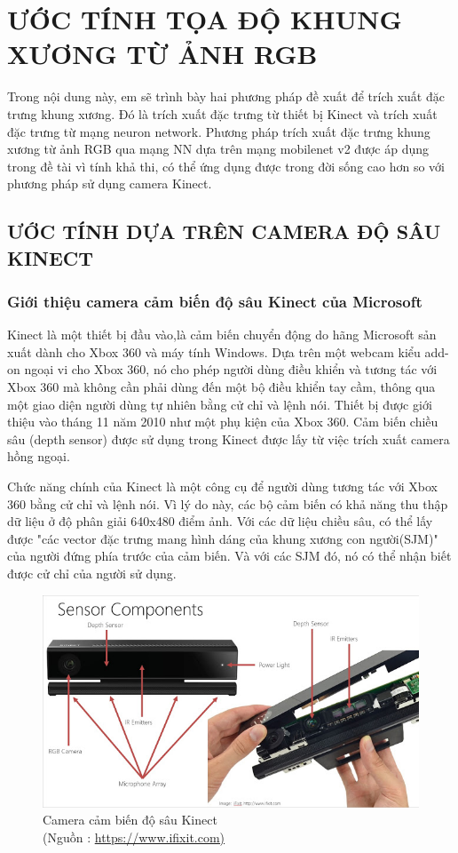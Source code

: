 \chapter{ƯỚC TÍNH TỌA ĐỘ KHUNG XƯƠNG TỪ ẢNH RGB}
\label{s:pose estimate}
Trong nội dung này, em sẽ trình bày hai phương pháp đề xuất để trích xuất đặc trưng khung xương. Đó là trích xuất đặc trưng từ thiết bị Kinect và trích xuất đặc trưng từ mạng neuron network. Phương pháp trích xuất đặc trưng khung xương từ ảnh RGB qua mạng NN dựa trên mạng mobilenet v2 được áp dụng trong đề tài vì tính khả thi, có thể ứng dụng được trong đời sống cao hơn so với phương pháp sử dụng camera Kinect.

\section{ƯỚC TÍNH DỰA TRÊN CAMERA ĐỘ SÂU KINECT}
\label{ss:kinect}
\subsection{Giới thiệu camera cảm biến độ sâu Kinect của Microsoft}
Kinect là một thiết bị đầu vào,là cảm biến chuyển động do hãng Microsoft sản xuất dành cho Xbox 360 và máy tính Windows. Dựa trên một webcam kiểu add-on ngoại vi cho Xbox 360, nó cho phép người dùng điều khiển và tương tác với Xbox 360 mà không cần phải dùng đến một bộ điều khiển tay cầm, thông qua một giao diện người dùng tự nhiên bằng cử chỉ và lệnh nói. Thiết bị được giới thiệu vào tháng 11 năm 2010 như một phụ kiện của Xbox 360. Cảm biến chiều sâu (depth sensor) được sử dụng trong Kinect được lấy từ việc trích xuất camera hồng ngoại. 

Chức năng chính của Kinect là một công cụ để người dùng tương tác với Xbox 360 bằng cử chỉ và lệnh nói. Vì lý do này, các bộ cảm biến có khả năng thu thập dữ liệu ở độ phân giải 640x480 điểm ảnh. Với các dữ liệu chiều sâu, có thể lấy được "các vector đặc trưng mang hình dáng của khung xương con người(SJM)" của người đứng phía trước của cảm biến. Và với các SJM đó, nó có thể nhận biết được cử chỉ của người sử dụng.


\begin{figure}[htp]
\begin{center}
\includegraphics[scale=0.8]{chap3/c3_figs/kinect.png}
\end{center}
\caption{Camera cảm biến độ sâu Kinect \\(Nguồn : \url{https://www.ifixit.com)}}
\label{fig:kinect}
\end{figure}


